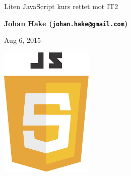 \documentclass[%
oneside,                 %
final,                   %
10pt]{article}
\begin{document}






\thispagestyle{empty}

\begin{center}
{\LARGE\bf
\begin{spacing}{1.25}
Liten JavaScript kurs rettet mot IT2
\end{spacing}
}
\end{center}


\begin{center}
{\bf Johan Hake${}^{}$ (\texttt{johan.hake@gmail.com})} \\ [0mm]
\end{center}

\begin{center}
\end{center}
    

\begin{center} %
Aug 6, 2015
\end{center}

\vspace{1cm}





\centerline{\includegraphics[width=0.5\linewidth]{figures/javascript-seeklogo.pdf}}
\end{document}
